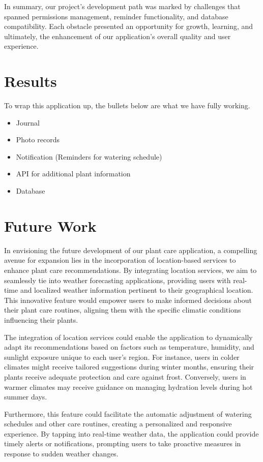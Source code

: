 \documentclass{sigchi}
\begin{document}
In summary, our project's development path was marked by challenges that spanned permissions management, reminder functionality, and database compatibility. Each obstacle presented an opportunity for growth, learning, and ultimately, the enhancement of our application's overall quality and user experience.

\section{Results}
To wrap this application up, the bullets below are what we have fully working.
\begin{itemize}
    \item Journal
    \item Photo records
    \item Notification (Reminders for watering schedule)
    \item API for additional plant information
    \item Database
\end{itemize}

\section{Future Work}

In envisioning the future development of our plant care application, a compelling avenue for expansion lies in the incorporation of location-based services to enhance plant care recommendations. By integrating location services, we aim to seamlessly tie into weather forecasting applications, providing users with real-time and localized weather information pertinent to their geographical location. This innovative feature would empower users to make informed decisions about their plant care routines, aligning them with the specific climatic conditions influencing their plants.

The integration of location services could enable the application to dynamically adapt its recommendations based on factors such as temperature, humidity, and sunlight exposure unique to each user's region. For instance, users in colder climates might receive tailored suggestions during winter months, ensuring their plants receive adequate protection and care against frost. Conversely, users in warmer climates may receive guidance on managing hydration levels during hot summer days.

Furthermore, this feature could facilitate the automatic adjustment of watering schedules and other care routines, creating a personalized and responsive experience. By tapping into real-time weather data, the application could provide timely alerts or notifications, prompting users to take proactive measures in response to sudden weather changes.
\end{document}

